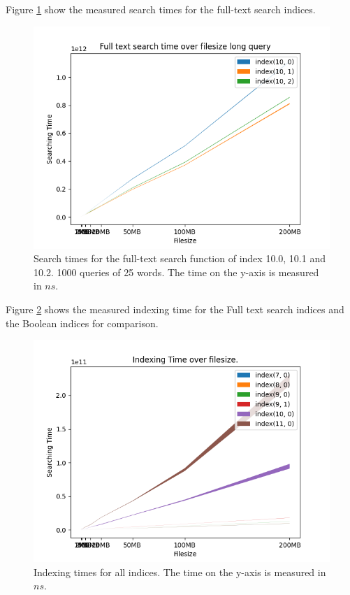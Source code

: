 Figure \ref{fig:Searchtimefulltext10long} show the measured search times for the full-text search indices.

\begin{figure}[ht!]
    \centering
    \includegraphics[width=.8\textwidth]{LaTeX/Pictures/Results/Fulltexlong[(10, 0), (10, 1), (10, 2)].png}
    \caption{Search times for the full-text search function of index 10.0, 10.1 and 10.2. 1000 queries of 25 words. The time on the y-axis is measured in $ns$.}
    \label{fig:Searchtimefulltext10long}
\end{figure}

Figure \ref{fig:IndexingAll} shows the measured indexing time for the Full text search indices and the Boolean indices for comparison.

\begin{figure}[ht!]
    \centering
    \includegraphics[width=.8\textwidth]{LaTeX/Pictures/Results/Indexing[(7, 0), (8, 0), (9, 0), (9, 1), (10, 0), (11, 0)].png}
    \caption{Indexing times for all indices. The time on the y-axis is measured in $ns$.}
    \label{fig:IndexingAll}
\end{figure}